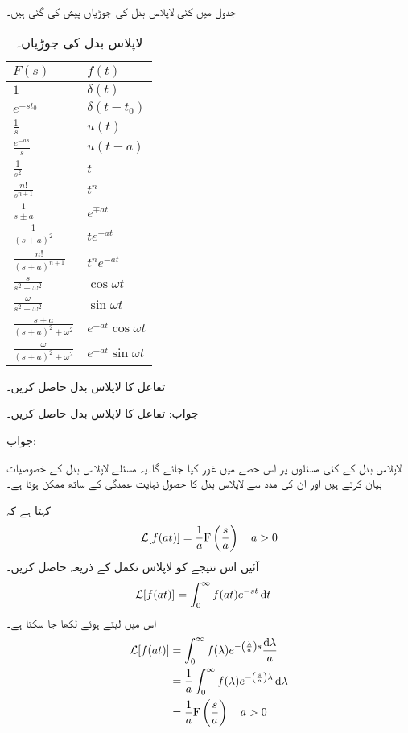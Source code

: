 جدول  میں کئی لاپلاس بدل کی جوڑیاں پیش کی گئی ہیں۔
\begin{table}
\caption{لاپلاس بدل کی جوڑیاں۔}
\label{جدول_لاپلاس_بدل_جوڑیاں}
\centering
\begin{tabular}{l l}
$F(s)$&$f(t)$\\[2ex] 
\hline 
$1$&$\delta(t)$ \\[2ex] 
$e^{-s t_0}$&$\delta(t-t_0)$ \\[2ex] 
$\frac{1}{s}$&$u(t)$ \\[2ex] 
$\frac{e^{-as}}{s}$&$u(t-a)$ \\[2ex] 
$\frac{1}{s^2}$&$t$ \\[2ex] 
$\frac{n!}{s^{n+1}}$&$t^n$ \\[2ex] 
$\frac{1}{s\pm a}$&$e^{\mp at}$ \\[2ex] 
$\frac{1}{(s+a)^2}$&$te^{-at}$ \\[2ex] 
$\frac{n!}{(s+a)^{n+1}}$&$t^n e^{-at}$ \\[2ex] 
$\frac{s}{s^2+\omega^2}$&$\cos \omega t$ \\[2ex] 
$\frac{\omega}{s^2+\omega^2}$&$\sin \omega t$ \\[2ex] 
$\frac{s+a}{(s+a)^2+\omega^2}$&$e^{-at} \cos \omega t$ \\[2ex] 
$\frac{\omega}{(s+a)^2+\omega^2}$&$e^{-at} \sin \omega t$ 
\end{tabular}
\end{table}

تفاعل  کا لاپلاس بدل حاصل کریں۔

جواب:
تفاعل  کا لاپلاس بدل حاصل کریں۔

جواب:

لاپلاس بدل کے کئی مسئلوں پر اس حصے میں غور کیا جائے گا۔یہ مسئلے لاپلاس بدل کے خصوصیات بیان کرتے ہیں اور ان کی مدد سے لاپلاس بدل کا حصول نہایت عمدگی کے ساتھ ممکن ہوتا ہے۔

 کہتا ہے کہ
\begin{align}
\mathcal{L}[f(at)]=\frac{1}{a} {{\textup{F}}}\left(\frac{s}{a}\right) \quad a>0
\end{align}
آئیں اس نتیجے کو لاپلاس تکمل کے ذریعہ حاصل کریں۔
\begin{align*}
\Laplace[f(at)]&=\int_0^{\infty} f(at) e^{-st} \dif t
\end{align*}
اس میں  لیتے ہوئے  لکھا جا سکتا ہے۔
\begin{align*}
\Laplace[f(at)]&=\int_0^{\infty} f(\lambda) e^{-\left(\frac{\lambda}{a}\right)s} \frac{\dif \lambda}{a}\\
&=\frac{1}{a}\int_0^{\infty} f(\lambda) e^{-\left(\frac{s}{a}\right)\lambda } \dif \lambda\\
&=\frac{1}{a} \bF\left(\frac{s}{a}\right) \quad a>0
\end{align*}


